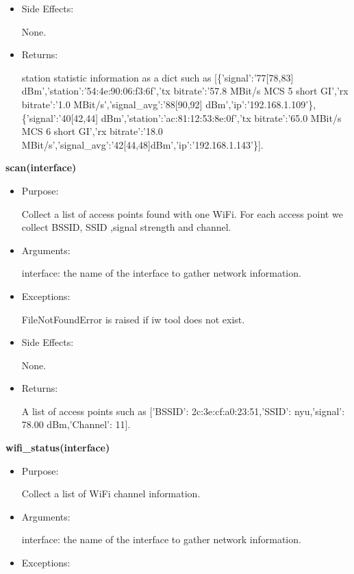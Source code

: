 {\begin{itemize}
FileNotFoundError is raised if iw tool does not exist.

\item Side Effects:

None.

\item Returns:

station statistic information as a dict such as [\{'signal':'77[78,83] dBm','station':'54:4e:90:06:f3:6f','tx bitrate':'57.8 MBit/s MCS 5 short GI','rx bitrate':'1.0 MBit/s','signal\_avg':'88[90,92] dBm','ip':'192.168.1.109'\}, \{'signal':'40[42,44] dBm','station':'ac:81:12:53:8e:0f','tx bitrate':'65.0 MBit/s MCS 6 short GI','rx bitrate':'18.0 
MBit/s','signal\_avg':'42[44,48]dBm','ip':'192.168.1.143'\}].
\end{itemize}

\textbf{scan(interface)}
\begin{itemize}
\item Purpose:

Collect a list of access points found with one WiFi. For each access point we collect BSSID, SSID ,signal strength and channel.

\item Arguments:

interface: the name of the interface to gather network information.

\item Exceptions:

FileNotFoundError is raised if iw tool does not exist.

\item Side Effects:

None.

\item Returns:

A list of access points such as [{'BSSID': 2c:3e:cf:a0:23:51,'SSID': nyu,'signal': 78.00 dBm,'Channel': 11}].
\end{itemize}

\textbf{wifi\_status(interface)}
\begin{itemize}
\item Purpose:

Collect a list of WiFi channel information.

\item Arguments:

interface: the name of the interface to gather network information.

\item Exceptions:


\end{itemize}}
